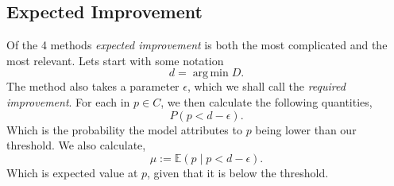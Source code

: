 \documentclass[working, oneside]{../../Preambles/tuftebook}
\DeclareMathOperator*{\argmin}{arg\,min}
\begin{document}
\subsection*{Expected Improvement}
Of the 4 methods \textit{expected improvement} is both the most complicated and the most relevant. Lets start with some notation 
\[
    d = \argmin{D}
.\] 
The method also takes a parameter $\epsilon$, which we shall call the \textit{required improvement}. For each in $p \in C$, we then calculate the following quantities,
\[
P(p < d - \epsilon)
.\] 
Which is the probability the model attributes to $p$ being lower than our threshold. We also calculate,
\[
\mu := \mathbb{E}\left( p \mid p < d - \epsilon \right) 
.\] 
Which is expected value at $p$, given that it is below the threshold.
\end{document}
